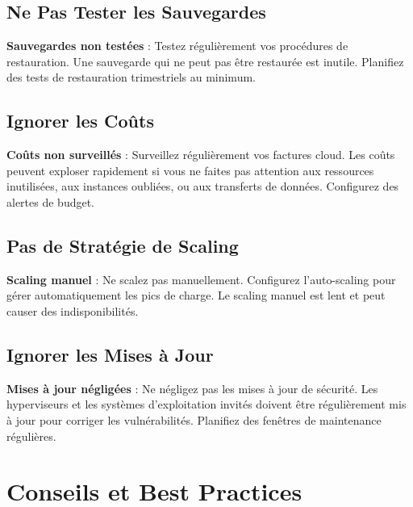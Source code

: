 \documentclass[11pt,a4paper]{article}
\begin{document}
\subsection{Ne Pas Tester les Sauvegardes}

\begin{dangerbox}
\textbf{Sauvegardes non testées} : Testez régulièrement vos procédures de restauration. Une sauvegarde qui ne peut pas être restaurée est inutile. Planifiez des tests de restauration trimestriels au minimum.
\end{dangerbox}

\subsection{Ignorer les Coûts}

\begin{dangerbox}
\textbf{Coûts non surveillés} : Surveillez régulièrement vos factures cloud. Les coûts peuvent exploser rapidement si vous ne faites pas attention aux ressources inutilisées, aux instances oubliées, ou aux transferts de données. Configurez des alertes de budget.
\end{dangerbox}

\subsection{Pas de Stratégie de Scaling}

\begin{dangerbox}
\textbf{Scaling manuel} : Ne scalez pas manuellement. Configurez l'auto-scaling pour gérer automatiquement les pics de charge. Le scaling manuel est lent et peut causer des indisponibilités.
\end{dangerbox}

\subsection{Ignorer les Mises à Jour}

\begin{dangerbox}
\textbf{Mises à jour négligées} : Ne négligez pas les mises à jour de sécurité. Les hyperviseurs et les systèmes d'exploitation invités doivent être régulièrement mis à jour pour corriger les vulnérabilités. Planifiez des fenêtres de maintenance régulières.
\end{dangerbox}

\section{Conseils et Best Practices}
\end{document}
